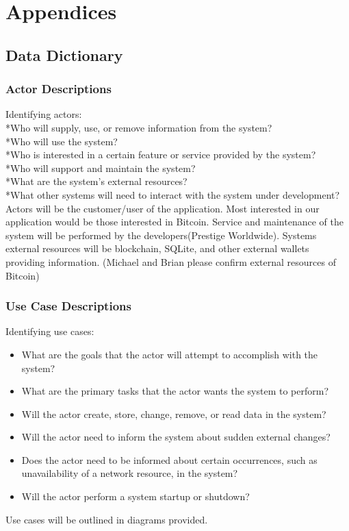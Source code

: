 \section{Appendices}
  \subsection{Data Dictionary}
    \subsubsection{Actor Descriptions}

Identifying actors:\\
*Who will supply, use, or remove information from the system?\\
*Who will use the system?\\
*Who is interested in a certain feature or service provided by the system?\\
*Who will support and maintain the system?\\
*What are the system's external resources?\\
*What other systems will need to interact with the system under development?\\

Actors will be the customer/user of the application.  Most interested in our application would be those interested in Bitcoin. Service and maintenance of the system will be performed by the developers(Prestige Worldwide). Systems external resources will be blockchain, SQLite, and other external wallets providing information. (Michael and Brian please confirm external resources of Bitcoin)


    \subsubsection{Use Case Descriptions}

Identifying use cases:\\
\begin{itemize}
\item What are the goals that the actor will attempt to accomplish with the system?
\item What are the primary tasks that the actor wants the system to perform?
\item Will the actor create, store, change, remove, or read data in the system?
\item Will the actor need to inform the system about sudden external changes?
\item Does the actor need to be informed about certain occurrences, such as unavailability of a network resource, in the system?
\item Will the actor perform a system startup or shutdown?
\end{itemize}
Use cases will be outlined in diagrams provided.\\ 


